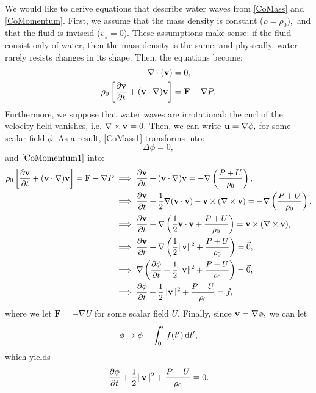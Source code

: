 \documentclass[10pt,reqno,oneside,a4paper]{article}
\begin{document}
We would like to derive equations that describe water waves from \eqref{CoMass} and \eqref{CoMomentum}. First, we assume that the mass density is constant ($\rho = \rho_0),$ and that the fluid is inviscid ($v_{\star} = 0$). These assumptions make sense: if the fluid consist only of water, then the mass density is the same, and physically, water rarely resists changes in its shape. Then, the equations become:
\begin{align}
\nabla \cdot ({\bf v}) &= 0, \label{CoMass1} \\
\rho_0\left[ \frac{\partial {\bf v}}{\partial t} + ({\bf v} \cdot \nabla) {\bf v}\right] &= \textbf{F} - \nabla P. \label{CoMomentum1}
\end{align}
Furthermore, we suppose that water waves are irrotational: the curl of the velocity field vanishes, i.e. $\nabla \times {\bf v} = \vec{0}.$ Then, we can write ${\bf u} = \nabla \phi,$ for some scalar field $\phi.$ As a result, \eqref{CoMass1} transforms into:
\begin{equation}
\Delta \phi = 0, \label{CoMass2} 
\end{equation}
and $\eqref{CoMomentum1}$ into:
\begin{align}
\rho_0\left[\frac{\partial {\bf v}}{\partial t} + ({\bf v} \cdot \nabla) {\bf v} \right] = \mathbf{F} -\nabla P &\implies \frac{\partial {\bf v}}{\partial t} + ({\bf v} \cdot \nabla) {\bf v} = - \nabla \left( \frac{P+U}{\rho_0}\right), \nonumber\\
&\implies \frac{\partial {\bf v}}{\partial t} + \frac{1}{2}\nabla ( {\bf v} \cdot {\bf v}) - {\bf v} \times (\nabla \times {\bf v}) = - \nabla \left( \frac{P+U}{\rho_0}\right), \nonumber\\
&\implies \frac{\partial {\bf v}}{\partial t} + \nabla \left(\frac{1}{2} {\bf v} \cdot {\bf v} + \frac{P+U}{\rho_0}\right) = {\bf v} \times (\nabla \times {\bf v}), \nonumber\\
&\implies \frac{\partial {\bf v}}{\partial t} + \nabla \left(\frac{1}{2} \Vert {\bf v} \Vert^2 + \frac{P+U}{\rho_0}\right) = \vec{0},  \nonumber\\
&\implies \nabla \left(\frac{\partial \phi}{\partial t} + \frac{1}{2} \Vert {\bf v} \Vert^2 + \frac{P+U}{\rho_0} \right) = \vec{0},  \nonumber\\
&\implies \frac{\partial \phi}{\partial t} + \frac{1}{2} \Vert {\bf v} \Vert^2 + \frac{P+U}{\rho_0} = f, \label{CoMomentum2} 
\end{align}
where we let $\textbf{F} = -\nabla U$ for some scalar field $U.$ Finally, since ${\bf v} = \nabla \phi,$ we can let 
\[
\phi \mapsto \phi + \int^t_0 f(t') \,\mathrm{d} t',
\]
which yields 
\[ 
\frac{\partial \phi}{\partial t} + \frac{1}{2} \Vert {\bf v} \Vert^2 + \frac{P+U}{\rho_0} = 0.
\]
\end{document}
